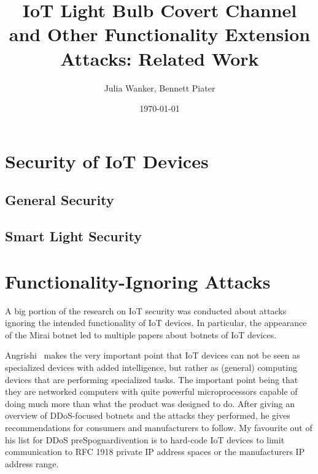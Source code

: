 \documentclass[11pt,a4paper]{article}
\begin{document}
	\title{IoT Light Bulb Covert Channel and Other Functionality Extension Attacks: Related Work}
	\author{Julia Wanker, Bennett Piater}
	\date{\today}
	\maketitle

	\section{Security of IoT Devices}%
	\label{sec:security_of_iot_devices}

	\subsection{General Security}%
	\label{sub:general_security}

	\cite{Grau:2015:Ctyf} %
	\cite{Bhartiya::YSFMK} %
	\cite{Restuccia:2018:SITNPaRC} %
  \cite{Zhang:2017:UISTDCBWWNaWWG} %

	\subsection{Smart Light Security}%
	\label{sub:smart_light_security}
	\cite{Dhanjani:2013:HLSEPHPWLS} %
	\cite{Morgner:2016:AYBBUICSSCLS} %
	\cite{Ronen:2018:IGNCZCR} %

	\section{Functionality-Ignoring Attacks}%
	\label{sec:functionality_ignoring_attacks}
	A big portion of the research on IoT security was conducted about attacks ignoring the intended functionality of IoT devices. In particular, the appearance of the Mirai botnet led to multiple papers about botnets of IoT devices.

	Angrishi~\cite{Angrishi:2017:TitiiiviIb} %
	makes the very important point that IoT devices can not be seen as specialized devices with added intelligence, but rather as (general) computing devices that are performing specialized tasks.
	The important point being that they are networked computers with quite powerful microprocessors capable of doing much more than what the product was designed to do.
	After giving an overview of DDoS-focused botnets and the attacks they performed, he gives recommendations for consumers and manufacturers to follow. My favourite out of his list for DDoS preSpognardivention is to hard-code IoT devices to limit communication to RFC 1918 private IP address spaces or the manufacturers IP address range.
\end{document}
